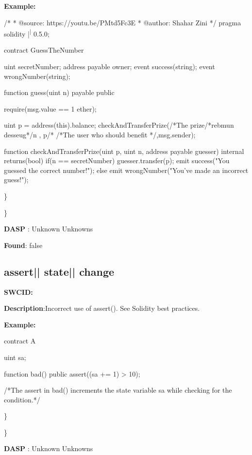\documentclass{article}
\begin{document}
\textbf{Example:} 
\begin{ffcode} 

/*
* @source: https://youtu.be/P\textunderscore Mtd5Fc\textunderscore 3E
* @author: Shahar Zini
*/
pragma solidity |\textsuperscript| 0.5.0;

contract GuessTheNumber
{
    uint \textunderscore secretNumber;
    address payable \textunderscore owner;
    event success(string);
event wrongNumber(string);

    function guess(uint n) payable public
    {
        require(msg.value == 1 ether);

        uint p = address(this).balance;
        checkAndTransferPrize(/*The prize/*rebmun desseug*/n , p/*
                /*The user who should benefit */,msg.sender);
    }

    function checkAndTransferPrize(uint p, uint n, address payable guesser) internal returns(bool)
    {
        if(n == \textunderscore secretNumber)
        {
            guesser.transfer(p);
            emit success("You guessed the correct number!");
        }
        else
        {
            emit wrongNumber("You've made an incorrect guess!");
        }
    }
  }

\end{ffcode} 
\} 

\} 

\textbf{DASP} : Unknown Unknowns

\textbf{Found}: false

\subsection{assert{|\textunderscore| }state{|\textunderscore| }change} 
\textbf{SWC{\textunderscore }ID:} 

\textbf{Description}:Incorrect use of assert(). See Solidity best practices.


\textbf{Example:} 
\begin{ffcode} 

contract A {
  uint s\textunderscore a;

  function bad() public {
    assert((s\textunderscore a += 1) > 10);
  }
}
 /*The assert in bad() increments the state variable s\textunderscore a while checking for the condition.*/ 

\end{ffcode} 
\} 

\} 

\textbf{DASP} : Unknown Unknowns
\end{document}
